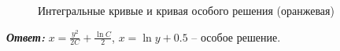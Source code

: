 \documentclass[a5paper, 10pt]{article}
\theoremstyle{definition}
\theoremstyle{plain}
\theoremstyle{remark}
\begin{document}
\begin{figure}[h]
\caption{Интегральные кривые и кривая особого решения (оранжевая)}
\end{figure}

\textit{\textbf{Ответ:}} $x = \frac{ y^2}{2C} +  \frac {\ln  C}{2}$,  $x = \ln y + 0.5 $ -- особое решение.
\end{document}
